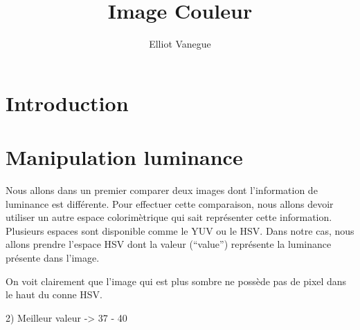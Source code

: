 \documentclass[a4paper,10pt]{article}
\title{Image Couleur}
\author{Elliot Vanegue}
\begin{document}
\maketitle
\section{Introduction}

\section{Manipulation luminance}
Nous allons dans un premier comparer deux images dont l'information de luminance est différente.
Pour effectuer cette comparaison, nous allons devoir utiliser un autre espace colorimètrique qui
sait représenter cette information. Plusieurs espaces sont disponible comme le YUV ou le HSV.
Dans notre cas, nous allons prendre l'espace HSV dont la valeur (\enquote{value}) représente 
la luminance présente dans l'image.


On voit clairement que l'image qui est plus sombre ne possède pas de pixel dans le haut du conne
HSV.

2) Meilleur valeur -> 37 - 40
\end{document}
